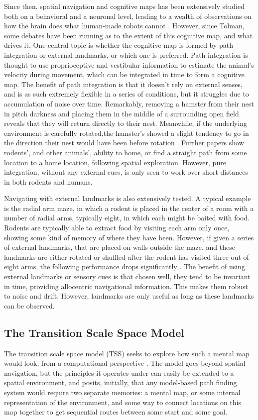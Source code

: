 \documentclass{article}
\begin{document}
    Since then, spatial navigation and cognitive maps has been extensively studied both on a behavioral and a neuronal level, leading to a wealth of observations on how the brain does what human-made robots cannot \parencite{Dudchenko2010}. However, since Tolman, some debates have been running as to the extent of this cognitive map, and what drives it. One central topic is whether the cognitive map is formed by path integration or external landmarks, or which one is preferred. Path integration is thought to use proprioceptive and vestibular information to estimate the animal's velocity during movement, which can be integrated in time to form a cognitive map. The benefit of path integration is that it doesn't rely on external senses, and is as such extremely flexible in a series of conditions, but it struggles due to accumulation of noise over time. 
    Remarkably, removing a hamster from their nest in pitch darkness and placing them in the middle of a surrounding open field reveals that they will return directly to their nest. Meanwhile, if the underlying environment is carefully rotated,the hamster's showed a slight tendency to go in the direction their nest would have been before rotation \parencite{Etienne1980}. Further papers show rodents', and other animals', ability to home, or find a straight path from some location to a home location, following spatial exploration. However, pure integration, without any external cues, is only seen to work over short distances in both rodents and humans.

    Navigating with external landmarks is also extensively tested. A typical example is the radial arm maze, in which a rodent is placed in the center of a room with a number of radial arms, typically eight, in which each might be baited with food. Rodents are typically able to extract food by visiting each arm only once, showing some kind of memory of where they have been. However, if given a series of external landmarks, that are placed on walls outside the maze, and these landmarks are either rotated or shuffled after the rodent has visited three out of eight arms, the following performance drops significantly \parencite{Suzuki1980}. The benefit of using external landmarks or sensory cues is that chosen well, they tend to be invariant in time, providing allocentric navigational information. This makes them robust to noise and drift. However, landmarks are only useful as long as these landmarks can be observed.
    
    
    \subsection{The Transition Scale Space Model}
    The transition scale space model (TSS) seeks to explore how such a mental map would look, from a computational perspective \parencite{Waniek2020}. The model goes beyond spatial navigation, but the principles it operates under can easily be extended to a spatial environment, and posits, initially, that any model-based path finding system would require two separate memories: a mental map, or some internal representation of the environment, and some way to connect locations on this map together to get sequential routes between some start and some goal.
\end{document}
